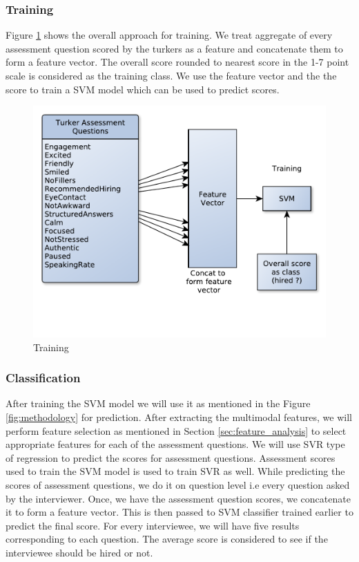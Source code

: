 \documentclass[11pt]{article}
\begin{document}
\subsubsection{Training}
Figure \ref{fig:methodology-training} shows the overall approach for training. We treat aggregate of every assessment question scored by the turkers as a feature and concatenate them to form a feature vector. The overall score rounded to nearest score in the 1-7 point scale is considered as the training class. We use the feature vector and the the score to train a SVM model which can be used to predict scores.
\begin{figure}[h!]
\begin{center}
\includegraphics[width=0.7\columnwidth]{figures/methodology-training.pdf}
\caption{Training}
\label{fig:methodology-training}
\end{center}
\end{figure}
\subsubsection{Classification}
After training the SVM model we will use it as mentioned in the Figure \ref{fig:methodology} for prediction. After extracting the multimodal features, we will perform feature selection as mentioned in Section \ref{sec:feature_analysis} to select appropriate features for each of the assessment questions. We will use SVR type of regression to predict the scores for assessment questions. Assessment scores used to train the SVM model is used to train SVR as well. While predicting the scores of assessment questions, we do it on question level i.e every question asked by the interviewer. Once, we have the assessment question scores, we concatenate it to form a feature vector. This is then passed to SVM classifier trained earlier to predict the final score. For every interviewee, we will have five results corresponding to each question. The average score is considered to see if the interviewee should be hired or not.
\end{document}
